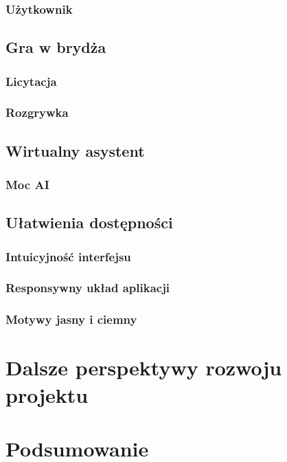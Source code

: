 \subsubsection{Użytkownik}


\subsection{Gra w brydża}

\subsubsection{Licytacja}
\subsubsection{Rozgrywka}


\subsection{Wirtualny asystent}

\subsubsection{Moc AI}


\subsection{Ułatwienia dostępności}

\subsubsection{Intuicyjność interfejsu}

\subsubsection{Responsywny układ aplikacji}
\subsubsection{Motywy jasny i ciemny}


\section{Dalsze perspektywy rozwoju projektu}

\section{Podsumowanie}


